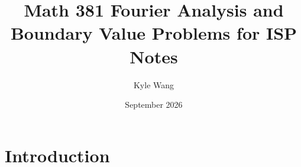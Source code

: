 \documentclass{article}
\title{Math 381 Fourier Analysis and Boundary Value Problems for ISP Notes}
\author{Kyle Wang}
\date{September 2026}
\begin{document}
\maketitle
\tableofcontents
\section{Introduction}
\end{document}
